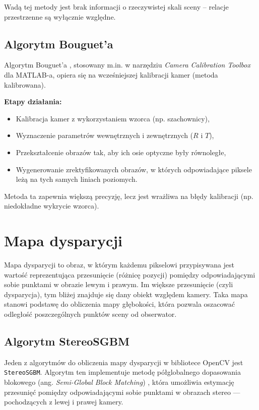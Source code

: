\documentclass[magisterska]{pracadypl}
\begin{document}
Wadą tej metody jest brak informacji o rzeczywistej skali sceny – relacje przestrzenne są wyłącznie względne.

\subsection{Algorytm Bouguet’a}

Algorytm Bouguet’a \cite{bouget}, stosowany m.in. w narzędziu \textit{Camera Calibration Toolbox} dla MATLAB-a, opiera się na wcześniejszej kalibracji kamer (metoda kalibrowana).

\textbf{Etapy działania:}
\begin{itemize}
    \item Kalibracja kamer z wykorzystaniem wzorca (np. szachownicy),
    \item Wyznaczenie parametrów wewnętrznych i zewnętrznych ($R$ i $T$),
    \item Przekształcenie obrazów tak, aby ich osie optyczne były równoległe,
    \item Wygenerowanie zrektyfikowanych obrazów, w których odpowiadające piksele leżą na tych samych liniach poziomych.
\end{itemize}

Metoda ta zapewnia większą precyzję, lecz jest wrażliwa na błędy kalibracji (np. niedokładne wykrycie wzorca).

\section{Mapa dysparycji}

Mapa dysparycji \cite{disparity} to obraz, w którym każdemu pikselowi przypisywana jest wartość reprezentująca przesunięcie (różnicę pozycji) pomiędzy odpowiadającymi sobie punktami w obrazie lewym i prawym. Im większe przesunięcie (czyli dysparycja), tym bliżej znajduje się dany obiekt względem kamery. Taka mapa stanowi podstawę do obliczenia mapy głębokości, która pozwala oszacować odległość poszczególnych punktów sceny od obserwator.

\subsection{Algorytm StereoSGBM}

Jeden z algorytmów do obliczenia mapy dysparycji w bibliotece OpenCV jest \texttt{StereoSGBM}. Algorytm ten implementuje metodę półglobalnego dopasowania blokowego (ang. \textit{Semi-Global Block Matching}) \cite{semi-global}, która umożliwia estymację przesunięć pomiędzy odpowiadającymi sobie punktami w obrazach stereo — pochodzących z lewej i prawej kamery.
\end{document}
